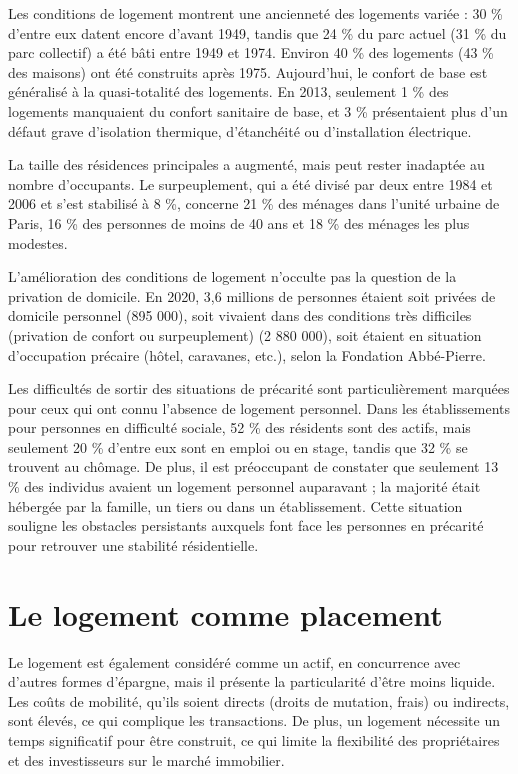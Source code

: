 \documentclass[a4paper, 12pt]{report}
\begin{document}
Les conditions de logement montrent une ancienneté des logements variée : 30 \% d'entre eux datent encore d’avant 1949, tandis que 24 \% du parc actuel (31 \% du parc collectif) a été bâti entre 1949 et 1974. Environ 40 \% des logements (43 \% des maisons) ont été construits après 1975. Aujourd’hui, le confort de base est généralisé à la quasi-totalité des logements. En 2013, seulement 1 \% des logements manquaient du confort sanitaire de base, et 3 \% présentaient plus d’un défaut grave d’isolation thermique, d’étanchéité ou d’installation électrique.

La taille des résidences principales a augmenté, mais peut rester inadaptée au nombre d’occupants. Le surpeuplement, qui a été divisé par deux entre 1984 et 2006 et s'est stabilisé à 8 \%, concerne 21 \% des ménages dans l’unité urbaine de Paris, 16 \% des personnes de moins de 40 ans et 18 \% des ménages les plus modestes.

L’amélioration des conditions de logement n’occulte pas la question de la privation de domicile. En 2020, 3,6 millions de personnes étaient soit privées de domicile personnel (895 000), soit vivaient dans des conditions très difficiles (privation de confort ou surpeuplement) (2 880 000), soit étaient en situation d’occupation précaire (hôtel, caravanes, etc.), selon la Fondation Abbé-Pierre.

Les difficultés de sortir des situations de précarité sont particulièrement marquées pour ceux qui ont connu l’absence de logement personnel. Dans les établissements pour personnes en difficulté sociale, 52 \% des résidents sont des actifs, mais seulement 20 \% d'entre eux sont en emploi ou en stage, tandis que 32 \% se trouvent au chômage. De plus, il est préoccupant de constater que seulement 13 \% des individus avaient un logement personnel auparavant ; la majorité était hébergée par la famille, un tiers ou dans un établissement. Cette situation souligne les obstacles persistants auxquels font face les personnes en précarité pour retrouver une stabilité résidentielle.

\section{Le logement comme placement}

Le logement est également considéré comme un actif, en concurrence avec d'autres formes d’épargne, mais il présente la particularité d’être moins liquide. Les coûts de mobilité, qu'ils soient directs (droits de mutation, frais) ou indirects, sont élevés, ce qui complique les transactions. De plus, un logement nécessite un temps significatif pour être construit, ce qui limite la flexibilité des propriétaires et des investisseurs sur le marché immobilier.
\end{document}
